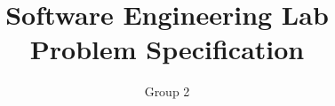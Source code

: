 \documentclass{article}
\begin{document}
\title{\textbf{Software Engineering Lab}
\\
\textbf{Problem Specification}}
\author{ Group 2 \\[0.2in]
}

\maketitle
\end{document}
